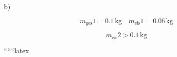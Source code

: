 b) 

\[
m_{\text{ges}} 1 = 0.1 \, \text{kg} \quad m_{\text{eis}} 1 = 0.06 \, \text{kg}
\]

\[
m_{\text{eis}} 2 > 0.1 \, \text{kg}
\]

``````latex